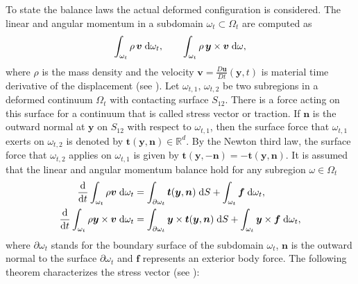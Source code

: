 To state the balance laws the actual deformed configuration is considered. The linear and angular momentum in a subdomain $\omega_t \subset \Omega_t$ are computed as 
\[
\int_{\omega_t} \rho \, \bm{v} \d{\omega_t}, \qquad \int_{\omega_t} \rho \, \bm{y} \times \bm{v} \d{\omega},
\]
where $\rho$ is the mass density and the velocity $\bm{v} = \frac{D\bm{u}}{Dt}(\bm{y},t)$ is material time derivative of the displacement (see \cite[Chapter 1]{abeyaratne2012notes}).  Let $\omega_{t, 1},\, \omega_{t, 2}$ be two subregions in a deformed continuum $\Omega_t$ with contacting surface $S_{12}$. There is a force acting on this surface for a continuum that is called stress vector or traction. If $\bm{n}$ is the outward normal at $\bm{y}$ on $S_{12}$ with respect to $\omega_{t, 1}$, then the surface force that $\omega_{t, 1}$ exerts on $\omega_{t, 2}$ is denoted by $\bm{t}(\bm{y}, \bm{n}) \in \mathbb{R}^d$. By the Newton third law, the surface force that $\omega_{t, 2}$ applies on $\omega_{t, 1}$ is given by $\bm{t}(\bm{y}, -\bm{n}) = - \bm{t}(\bm{y}, \bm{n})$. It is assumed that the linear and angular momentum balance hold for any subregion $\omega \in \Omega_t$ 
\begin{align*}
	\diff{}{t} \int_{\omega_t} \rho \bm{v} \d{\omega_t} &= \int_{\partial \omega_t} \bm{t}(\bm{y}, \bm{n}) \d{S} + \int_{\omega_t} \bm{f} \d{\omega_t}, \\
	\diff{}{t} \int_{\omega_t} \rho\bm{y} \times \bm{v} \d{\omega_t} &= \int_{\partial \omega_t} \bm{y} \times \bm{t}(\bm{y}, \bm{n}) \d{S} + \int_{\omega_t} \bm{y} \times \bm{f} \d{\omega_t}, \\
\end{align*}
where $\partial \omega_t$ stands for the boundary surface of the subdomain $\omega_t$, $\bm{n}$ is the outward normal to the surface $\partial\omega_t$ and $\bm{f}$ represents an exterior body force. The following theorem characterizes the stress vector (see \cite[Chapter 2]{ciarlet1988mathematical}):

